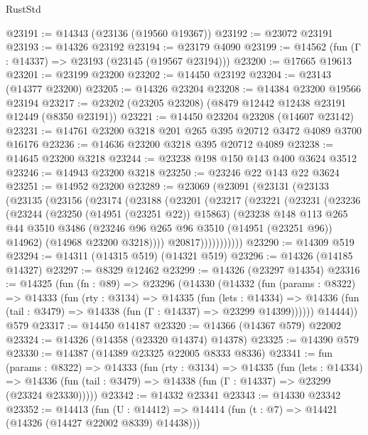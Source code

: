 \begin{lexlean}{RustStd}
\begin{coremodule}
@23191 := @14343 (@23136 (@19560 @19367))
@23192 := @23072 @23191
@23193 := @14326 @23192
@23194 := @23179 @4090
@23199 := @14562 (fun (Γ : @14337) => @23193 (@23145 (@19567 @23194)))
@23200 := @17665 @19613
@23201 := @23199 @23200
@23202 := @14450 @23192
@23204 := @23143 (@14377 @23200)
@23205 := @14326 @23204
@23208 := @14384 @23200 @19566 @23194
@23217 := @23202 (@23205 @23208) (@8479 @12442 @12438 @23191 @12449 (@8350 @23191))
@23221 := @14450 @23204 @23208 (@14607 @23142)
@23231 := @14761 @23200 @3218 @201 @265 @395 @20712 @3472 @4089 @3700 @16176
@23236 := @14636 @23200 @3218 @395 @20712 @4089
@23238 := @14645 @23200 @3218
@23244 := @23238 @198 @150 @143 @400 @3624 @3512
@23246 := @14943 @23200 @3218
@23250 := @23246 @22 @143 @22 @3624
@23251 := @14952 @23200
@23289 := @23069
    (@23091
      (@23131
        (@23133
          (@23135
            (@23156
              (@23174
                (@23188
                  (@23201
                    (@23217
                      (@23221
                        (@23231
                          (@23236
                            (@23244
                              (@23250 (@14951 (@23251 @22)) @15863)
                              (@23238
                                @148
                                @113
                                @265
                                @44
                                @3510
                                @3486
                                (@23246 @96 @265 @96 @3510 (@14951 (@23251 @96)) @14962)
                                (@14968 @23200 @3218))))
                          @20817)))))))))))
@23290 := @14309 @519
@23294 := @14311 (@14315 @519) (@14321 @519)
@23296 := @14326 (@14185 @14327)
@23297 := @8329 @12462
@23299 := @14326 (@23297 @14354)
@23316 := @14325
    (fun (fn : @89) =>
    @23296
      (@14330
        (@14332
          (fun (params : @8322) =>
          @14333
            (fun (rty : @3134) =>
            @14335
              (fun (lets : @14334) =>
              @14336 (fun (tail : @3479) => @14338 (fun (Γ : @14337) => @23299 @14399))))))
        @14444))
    @579
@23317 := @14450 @14187
@23320 := @14366 (@14367 @579) @22002
@23324 := @14326 (@14358 (@23320 @14374) @14378)
@23325 := @14390 @579
@23330 := @14387 (@14389 @23325 @22005 @8333 @8336)
@23341 := fun (params : @8322) =>
  @14333
    (fun (rty : @3134) =>
    @14335
      (fun (lets : @14334) =>
      @14336 (fun (tail : @3479) => @14338 (fun (Γ : @14337) => @23299 (@23324 @23330)))))
@23342 := @14332 @23341
@23343 := @14330 @23342
@23352 := @14413
    (fun (U : @14412) => @14414 (fun (t : @7) => @14421 (@14326 (@14427 @22002 @8339) @14438)))

\end{coremodule}
\end{lexlean}
